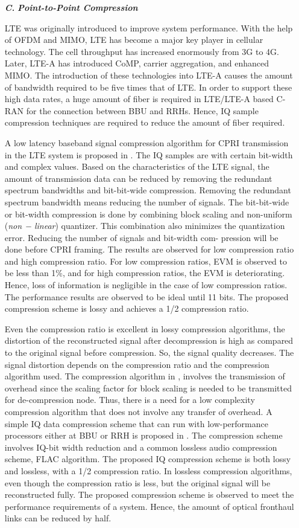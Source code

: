 \begin{multicols}{2}
\begin{itemize}
\item[{\textit{\textbf{ C.}}}] {\textit{\textbf{Point-to-Point Compression}}}

LTE was originally introduced to improve system performance. With the help of OFDM and MIMO, LTE has become a major key player in cellular technology. The cell throughput has increased enormously from 3G to 4G. Later, LTE-A has introduced CoMP, carrier aggregation, and enhanced MIMO. The introduction of these technologies into LTE-A causes the amount of bandwidth required to be five times that of LTE. In order to support these high data rates, a huge amount of fiber is required in LTE/LTE-A based C-RAN for the connection between BBU and RRHs. Hence, IQ sample compression techniques are required to reduce the amount of fiber required.

A low latency baseband signal compression algorithm for CPRI transmission in the LTE system is proposed in \cite{art3-key63}. The IQ samples are with certain bit-width and complex values. Based on the characteristics of the LTE signal, the amount of transmission data can be reduced by removing the redundant spectrum bandwidths and bit-bit-wide compression. Removing the redundant spectrum bandwidth means reducing the number of signals. The bit-bit-wide or bit-width compression is done by combining block scaling and non-uniform (\textit{non − linear}) quantizer. This combination also minimizes the quantization error. Reducing the number of signals and bit-width com- pression will be done before CPRI framing. The results are observed for low compression ratio and high compression ratio. For low compression ratios, EVM is observed to be less than 1\%, and for high compression ratios, the EVM is deteriorating. Hence, loss of information is negligible in the case of low compression ratios. The performance results are observed to be ideal until 11 bits. The proposed compression scheme is lossy and achieves a 1/2 compression ratio.

Even the compression ratio is excellent in lossy compression algorithms, the distortion of the reconstructed signal after decompression is high as compared to the original signal before compression. So, the signal quality decreases. The signal distortion depends on the compression ratio and the compression algorithm used. The compression algorithm in \cite{art3-key63}, involves the transmission of overhead since the scaling factor for block scaling is needed to be transmitted for de-compression node. Thus, there is a need for a low complexity compression algorithm that does not involve any transfer of overhead. A simple IQ data compression scheme that can run with low-performance processors either at BBU or RRH is proposed in \cite{art3-key64}. The compression scheme involves IQ-bit width reduction and a common lossless audio compression scheme, FLAC algorithm. The proposed IQ compression scheme is both lossy and lossless, with a 1/2 compression ratio. In lossless compression algorithms, even though the compression ratio is less, but the original signal will be reconstructed fully. The proposed compression scheme is observed to meet the performance requirements of a system. Hence, the amount of optical fronthaul links can be reduced by half. 


\end{itemize}
\end{multicols}
